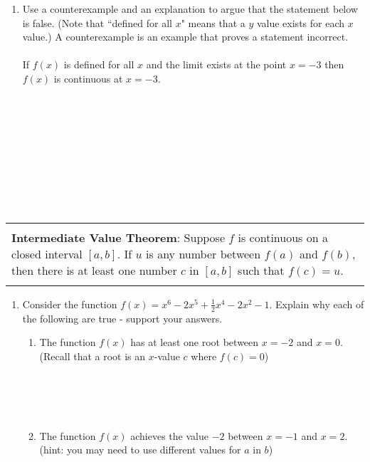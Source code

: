 \documentclass[12pt]{report}
\newenvironment{boxe}
    {\begin{center}
    \begin{tabular}{|p{0.9\textwidth}|}
    \hline\\
    }
    { 
    \\\\\hline
    \end{tabular} 
    \end{center}
    }
\begin{document}
\begin{enumerate}
\begin{enumerate}[label=\alph*.]
\end{enumerate}
\newpage
\item Use a counterexample and an explanation to argue that the statement below is false. (Note that ``defined for all $x$" means that a $y$ value exists for each $x$ value.) A counterexample is an example that proves a statement incorrect. \\\\
If $f(x)$ is defined for all $x$ and the limit exists at the point $x=-3$ then $f(x)$ is continuous at $x=-3$.\\\\\\\\\\\\\\\\\\\\


\end{enumerate} 

\begin{boxe}
\textbf{Intermediate Value Theorem}: Suppose $f$ is continuous on a closed interval $[a,b]$. If $u$ is any number between $f(a)$ and $f(b)$, then there is at least one number $c$ in $[a,b]$ such that $f(c)=u$.
\end{boxe}
\begin{enumerate}[resume*]
\item Consider the function $f(x)=x^{6}-2x^{5}+\frac{1}{2}x^{4}-2x^{2}-1$. Explain why each of the following are true - support your answers.\\
\begin{enumerate}[label=\alph*.]
    \item The function $f(x)$ has at least one root between $x=-2$ and $x=0$. (Recall that a root is an $x$-value $c$ where $f(c)=0$)\\\\\\\\\\
    \item The function $f(x)$ achieves the value $-2$ between $x=-1$ and $x=2$. (hint: you may need to use different values for $a$ in $b$)\\\\\\\\\\\\\\\\
\end{enumerate}
\end{enumerate}
\end{document}
